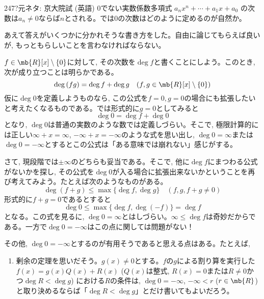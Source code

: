 \begin{thm}{247}{\hosi ?}{元ネタ: 京大院試 (英語)}
 0でない実数係数多項式 $a_nx^n+\cdots +a_1x+a_0$ の次数は$a_n\neq 0$ならば$n$とされる。では0の次数はどのように定めるのが自然か。
\end{thm}

あえて答えがいくつかに分かれそうな書き方をした。自由に論じてもらえば良いが, もっともらしいことを言わなければならない。\par
$f\in \mb{R}[x]\setminus{\{ 0 \}}$に対して, その次数を$\deg{f}$と書くことにしよう。このとき, 次が成り立つことは明らかである。
\[\deg{(fg)} = \deg{f} + \deg{g}\quad (f,g\in \mb{R}[x]\setminus{\{ 0 \}})\]
仮に$\deg{0}$を定義しようものなら, この公式を$f=0, g=0$の場合にも拡張したいと考えたくなるものである。では形式的に$g=0$としてみると
\[\deg{0} = \deg{f} + \deg{0}\]
となり, $\deg{0}$は普通の実数のような数では定義しづらい。そこで, 極限計算的には正しい$\infty + x = \infty$, $-\infty + x = -\infty$のような式を思い出し, $\deg{0} = \infty$または$\deg{0} = -\infty$とするとこの公式は「ある意味では崩れない」感じがする。\par 
さて, 現段階では$\pm \infty$のどちらも妥当である。そこで, 他に$\deg{f}$にまつわる公式がないかを探し, その公式を$\deg{0}$が入る場合に拡張出来ないかということを再び考えてみよう。たとえば次のようなものがある。
\[\deg{(f+g)} \leq  \max{\{ \deg{f}, \deg{g}\} } \quad (f,g,f+g\neq 0)\]
形式的に$f+g = 0$であるとすると
\[\deg{0} \leq \max{\{ \deg{f}, \deg{(-f)}\} } = \deg{f}\]
となる。この式を見るに, $\deg{0} = \infty$とはしづらい。$\infty \leq \deg{f}$は奇妙だからである。一方で$\deg{0} = -\infty$はこの点に関しては問題がない！\par 
その他, $\deg{0} = -\infty$とするのが有用そうであると思える点はある。たとえば, 
\begin{enumerate}
 \item 剰余の定理を思いだそう。$g(x)\neq 0$とする。$f$の$g$による割り算を実行した$f(x) = g(x)Q(x) + R(x)$ ($Q(x)$は整式, $R(x) = 0$または$R\neq 0$かつ$\deg{R} < \deg{g}$) における$R$の条件は, $\deg{0} = -\infty$, $-\infty < r$ ($r\in \mb{R}$)と取り決めるならば「$\deg{R} < \deg{g}$」とだけ書いてもよいだろう。  
\end{enumerate}

